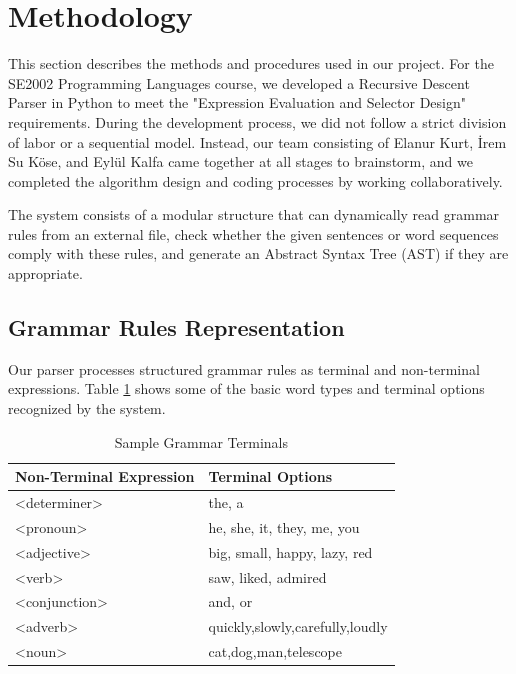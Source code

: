 \documentclass[12pt,a4paper]{article}
\begin{document}
	\section{Methodology}
	This section describes the methods and procedures used in our project. For the SE2002 Programming Languages course, we developed a Recursive Descent Parser in Python to meet the "Expression Evaluation and Selector Design" requirements. During the development process, we did not follow a strict division of labor or a sequential model. Instead, our team consisting of Elanur Kurt, İrem Su Köse, and Eylül Kalfa came together at all stages to brainstorm, and we completed the algorithm design and coding processes by working collaboratively.

The system consists of a modular structure that can dynamically read grammar rules from an external file, check whether the given sentences or word sequences comply with these rules, and generate an Abstract Syntax Tree (AST) if they are appropriate.

\subsection{Grammar Rules Representation}
Our parser processes structured grammar rules as terminal and non-terminal expressions. Table \ref{tab:terminals} shows some of the basic word types and terminal options recognized by the system.

\begin{table}[h!]
    \centering
    \begin{tabular}{|l|l|}
       
        \hline
        \textbf{Non-Terminal Expression} & \textbf{Terminal Options} \\
        \hline
        \textless determiner\textgreater & the, a \\
        \hline
        \textless pronoun\textgreater & he, she, it, they, me, you \\
        \hline
        \textless adjective\textgreater & big, small, happy, lazy, red \\
        \hline
        \textless verb\textgreater & saw, liked, admired \\
        \hline
         
         \textless conjunction\textgreater & and, or \\
          \hline
         \textless adverb\textgreater & quickly,slowly,carefully,loudly \\
          \hline
         \textless noun\textgreater & cat,dog,man,telescope \\
         \hline
    \end{tabular}
    \caption{Sample Grammar Terminals}
    \label{tab:terminals}
\end{table}
\end{document}
